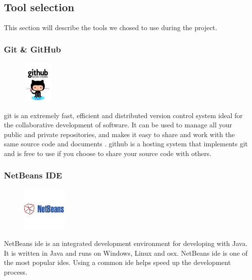 \subsection{Tool selection}
This section will describe the tools we chosed to use during the project.
\subsubsection{Git \& GitHub}
\begin{figure}
  \vspace{-40pt}
  \begin{center}
    \includegraphics[width=60px,height=80px]{GitHub}
  \end{center}

\end{figure}
\gls{git} is an extremely fast, efficient and distributed version control system ideal for the collaborative development of software. It can be used to manage all your public and private repositories, and makes it easy to share and work with the same source code and documents \cite{bib:git}. \gls{github} is a hosting system that implements git and is free to use if you choose to share your source code with others. 

\subsubsection{NetBeans IDE}
\begin{figure}
  \vspace{-65pt}
  \begin{center}
    \includegraphics[width=0.2\textwidth]{NetBeans}
  \end{center}

\end{figure}
NetBeans \gls{ide} is an integrated development environment for developing with Java. It is written in Java and runs on Windows, Linux and \gls{osx}. NetBeans \gls{ide} is one of the most popular \gls{ide}s. Using a common \gls{ide} helps speed up the development process.   

